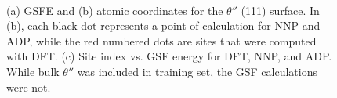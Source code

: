 \documentclass{article}
\begin{document}
\begin{figure}[H]%
\centering%
%
%
\\
%
\caption{(a) GSFE and (b) atomic coordinates for the $\theta''$ (111) surface. 
In (b), each black dot represents a point of calculation for NNP and ADP, while the red numbered dots are sites that were computed with DFT.
(c) Site index vs. GSF energy for DFT, NNP, and ADP.
While bulk $\theta''$ was included
in training set, the GSF calculations were not.}
\label{fig:GSF_ThetaDP_111}
\end{figure}
\end{document}
